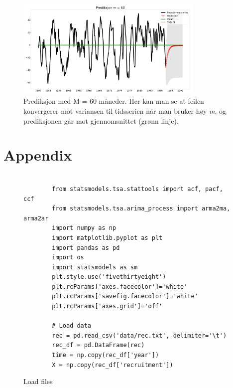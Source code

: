     \begin{figure}[hbt!]
        {\centering
            \includegraphics[width=0.80\textwidth]{task_3.pdf}
            \caption{Prediksjon med M = 60 måneder. Her kan man se at feilen konvergerer mot variansen til tidsserien når man bruker høy \emph{m}, og prediksjonen går mot gjennomsnittet (grønn linje).}
            \label{task_33}
        \par}
        \end{figure}











\clearpage
\newpage

\section{Appendix}


\begin{figure}[hbt!]
    \begin{lstlisting}

        from statsmodels.tsa.stattools import acf, pacf, ccf
        from statsmodels.tsa.arima_process import arma2ma, arma2ar
        import numpy as np
        import matplotlib.pyplot as plt
        import pandas as pd
        import os
        import statsmodels as sm
        plt.style.use('fivethirtyeight')
        plt.rcParams['axes.facecolor']='white'
        plt.rcParams['savefig.facecolor']='white'
        plt.rcParams['axes.grid']='off'
        
        # Load data
        rec = pd.read_csv('data/rec.txt', delimiter='\t')
        rec_df = pd.DataFrame(rec)
        time = np.copy(rec_df['year'])
        X = np.copy(rec_df['recruitment'])
    \end{lstlisting}
\caption{Load files}
\label{Kode2}
\end{figure}

